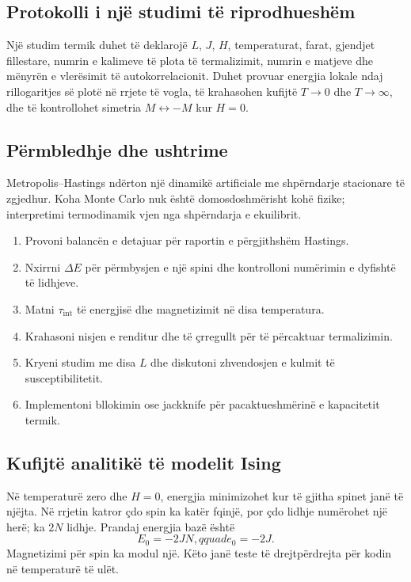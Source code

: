 \documentclass[11pt,oneside,openany]{book}
\begin{document}
\subsection{Protokolli i një studimi të riprodhueshëm}
Një studim termik duhet të deklarojë $L$, $J$, $H$, temperaturat, farat, gjendjet fillestare, numrin e kalimeve të plota të termalizimit, numrin e matjeve dhe mënyrën e vlerësimit të autokorrelacionit. Duhet provuar energjia lokale ndaj rillogaritjes së plotë në rrjete të vogla, të krahasohen kufijtë $T\to0$ dhe $T\to\infty$, dhe të kontrollohet simetria $M\leftrightarrow-M$ kur $H=0$.

\subsection{Përmbledhje dhe ushtrime}
Metropolis--Hastings ndërton një dinamikë artificiale me shpërndarje stacionare të zgjedhur. Koha Monte Carlo nuk është domosdoshmërisht kohë fizike; interpretimi termodinamik vjen nga shpërndarja e ekuilibrit.
\begin{enumerate}
\item Provoni balancën e detajuar për raportin e përgjithshëm Hastings.
\item Nxirrni $\Delta E$ për përmbysjen e një spini dhe kontrolloni numërimin e dyfishtë të lidhjeve.
\item Matni $\tau_{\mathrm{int}}$ të energjisë dhe magnetizimit në disa temperatura.
\item Krahasoni nisjen e renditur dhe të çrregullt për të përcaktuar termalizimin.
\item Kryeni studim me disa $L$ dhe diskutoni zhvendosjen e kulmit të susceptibilitetit.
\item Implementoni bllokimin ose jackknife për pacaktueshmërinë e kapacitetit termik.
\end{enumerate}



\subsection{Kufijtë analitikë të modelit Ising}
Në temperaturë zero dhe $H=0$, energjia minimizohet kur të gjitha spinet janë të njëjta. Në rrjetin katror çdo spin ka katër fqinjë, por çdo lidhje numërohet një herë; ka $2N$ lidhje. Prandaj energjia bazë është
\begin{equation}
 E_0=-2JN,qquad e_0=-2J.
\end{equation}
Magnetizimi për spin ka modul një. Këto janë teste të drejtpërdrejta për kodin në temperaturë të ulët.
\end{document}
